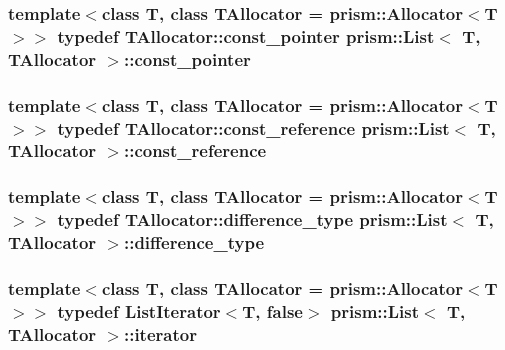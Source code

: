 \subsubsection[{\texorpdfstring{const\+\_\+pointer}{const_pointer}}]{\setlength{\rightskip}{0pt plus 5cm}template$<$class T, class T\+Allocator = prism\+::\+Allocator$<$\+T$>$$>$ typedef T\+Allocator\+::const\+\_\+pointer {\bf prism\+::\+List}$<$ T, T\+Allocator $>$\+::{\bf const\+\_\+pointer}}\hypertarget{classprism_1_1_list_adf013407d4299ad4a1ca8db6e8d7c16e}{}\label{classprism_1_1_list_adf013407d4299ad4a1ca8db6e8d7c16e}
\subsubsection[{\texorpdfstring{const\+\_\+reference}{const_reference}}]{\setlength{\rightskip}{0pt plus 5cm}template$<$class T, class T\+Allocator = prism\+::\+Allocator$<$\+T$>$$>$ typedef T\+Allocator\+::const\+\_\+reference {\bf prism\+::\+List}$<$ T, T\+Allocator $>$\+::{\bf const\+\_\+reference}}\hypertarget{classprism_1_1_list_aa263682b12cb5ca200c1b30f85fac524}{}\label{classprism_1_1_list_aa263682b12cb5ca200c1b30f85fac524}
\subsubsection[{\texorpdfstring{difference\+\_\+type}{difference_type}}]{\setlength{\rightskip}{0pt plus 5cm}template$<$class T, class T\+Allocator = prism\+::\+Allocator$<$\+T$>$$>$ typedef T\+Allocator\+::difference\+\_\+type {\bf prism\+::\+List}$<$ T, T\+Allocator $>$\+::{\bf difference\+\_\+type}}\hypertarget{classprism_1_1_list_a02ec6617f6c1782af39c85431c6803ab}{}\label{classprism_1_1_list_a02ec6617f6c1782af39c85431c6803ab}
\subsubsection[{\texorpdfstring{iterator}{iterator}}]{\setlength{\rightskip}{0pt plus 5cm}template$<$class T, class T\+Allocator = prism\+::\+Allocator$<$\+T$>$$>$ typedef List\+Iterator$<$T, false$>$ {\bf prism\+::\+List}$<$ T, T\+Allocator $>$\+::{\bf iterator}}\hypertarget{classprism_1_1_list_a32f6b5634a5aabc496ccb652eb22c490}{}\label{classprism_1_1_list_a32f6b5634a5aabc496ccb652eb22c490}
